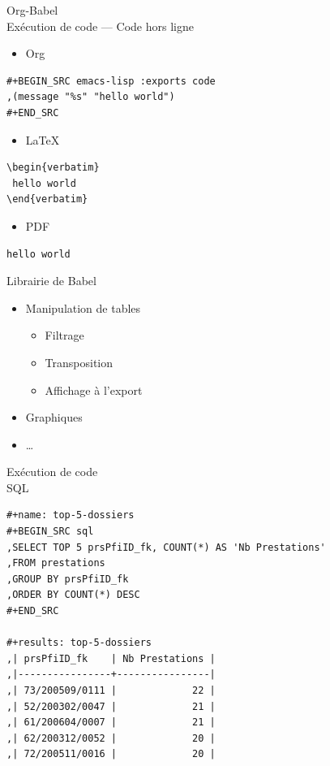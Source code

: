 \documentclass[presentation,t,hideothersubsections]{beamer}
\begin{document}
\begin{frame}[fragile,label=sec-5-7-5]{Org-Babel \\ Exécution de code --- Code hors ligne}
 \begin{itemize}
\item Org
\end{itemize}

\lstset{language=org,numbers=none}
\begin{lstlisting}
#+BEGIN_SRC emacs-lisp :exports code
,(message "%s" "hello world")
#+END_SRC
\end{lstlisting}

\begin{itemize}
\item \LaTeX{}
\end{itemize}

\lstset{language=TeX,numbers=none}
\begin{lstlisting}
\begin{verbatim}
 hello world
\end{verbatim}
\end{lstlisting}

\begin{itemize}
\item PDF
\end{itemize}

\begin{verbatim}
hello world
\end{verbatim}
\end{frame}
\begin{frame}[label=sec-5-7-6]{Librairie de Babel}
\begin{itemize}
\item Manipulation de tables
\begin{itemize}
\item Filtrage
\item Transposition
\item Affichage à l'export
\end{itemize}

\item Graphiques

\item \ldots{}
\end{itemize}
\end{frame}
\begin{frame}[fragile,label=sec-5-7-7]{Exécution de code \\ SQL}
 \lstset{language=org,numbers=none}
\begin{lstlisting}
#+name: top-5-dossiers
#+BEGIN_SRC sql
,SELECT TOP 5 prsPfiID_fk, COUNT(*) AS 'Nb Prestations'
,FROM prestations
,GROUP BY prsPfiID_fk
,ORDER BY COUNT(*) DESC
#+END_SRC

#+results: top-5-dossiers
,| prsPfiID_fk    | Nb Prestations |
,|----------------+----------------|
,| 73/200509/0111 |             22 |
,| 52/200302/0047 |             21 |
,| 61/200604/0007 |             21 |
,| 62/200312/0052 |             20 |
,| 72/200511/0016 |             20 |
\end{lstlisting}
\end{frame}
\end{document}
